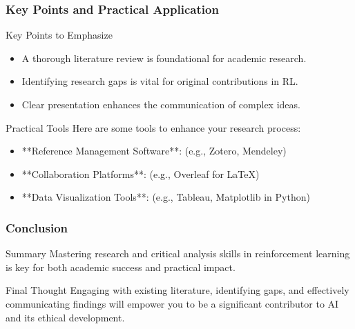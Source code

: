 \documentclass[aspectratio=169]{beamer}
\begin{document}
\begin{frame}[fragile]
    \frametitle{Key Points and Practical Application}
    \begin{block}{Key Points to Emphasize}
        \begin{itemize}
            \item A thorough literature review is foundational for academic research.
            \item Identifying research gaps is vital for original contributions in RL.
            \item Clear presentation enhances the communication of complex ideas.
        \end{itemize}
    \end{block}
    \begin{block}{Practical Tools}
        Here are some tools to enhance your research process:
        \begin{itemize}
            \item **Reference Management Software**: (e.g., Zotero, Mendeley)
            \item **Collaboration Platforms**: (e.g., Overleaf for LaTeX)
            \item **Data Visualization Tools**: (e.g., Tableau, Matplotlib in Python)
        \end{itemize}
    \end{block}
\end{frame}

\begin{frame}[fragile]
    \frametitle{Conclusion}
    \begin{block}{Summary}
        Mastering research and critical analysis skills in reinforcement learning is key for both academic success and practical impact.
    \end{block}
    \begin{block}{Final Thought}
        Engaging with existing literature, identifying gaps, and effectively communicating findings will empower you to be a significant contributor to AI and its ethical development.
    \end{block}
\end{frame}
\end{document}
